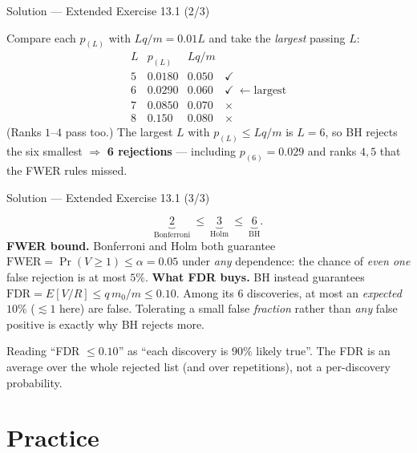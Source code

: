 \documentclass[aspectratio=169,11pt]{beamer}
\begin{document}
\begin{frame}{Solution --- Extended Exercise 13.1 (2/3)}
\begin{solutionbox}
  Compare each $p_{(L)}$ with $Lq/m=0.01L$ and take the \emph{largest} passing $L$:
  \[
    \begin{array}{c|c|c|c}
      L & p_{(L)} & Lq/m & \\ \hline
      5 & 0.0180 & 0.050 & \checkmark\\
      6 & 0.0290 & 0.060 & \checkmark\ \leftarrow \text{largest}\\
      7 & 0.0850 & 0.070 & \times\\
      8 & 0.150  & 0.080 & \times
    \end{array}
  \]
  (Ranks $1$--$4$ pass too.) The largest $L$ with $p_{(L)}\le Lq/m$ is $L=6$, so BH
  rejects the six smallest $\Rightarrow$ \textbf{6 rejections} --- including
  $p_{(6)}=0.029$ and ranks $4,5$ that the FWER rules missed.
\end{solutionbox}
\end{frame}

\begin{frame}{Solution --- Extended Exercise 13.1 (3/3)}
\begin{solutionbox}
  \[
    \underbrace{2}_{\text{Bonferroni}}\ \le\
    \underbrace{3}_{\text{Holm}}\ \le\
    \underbrace{6}_{\text{BH}} .
  \]
  \textbf{FWER bound.} Bonferroni and Holm both guarantee
  $\mathrm{FWER}=\Pr(V\ge1)\le\alpha=0.05$ under \emph{any} dependence: the chance of
  \emph{even one} false rejection is at most $5\%$.
  \medskip
  \textbf{What FDR buys.} BH instead guarantees
  $\mathrm{FDR}=E[V/R]\le q\,m_0/m\le 0.10$. Among its $6$ discoveries, at most an
  \emph{expected} $10\%$ ($\lesssim1$ here) are false. Tolerating a small false
  \emph{fraction} rather than \emph{any} false positive is exactly why BH rejects more.

\end{solutionbox}
\begin{mistake}
  Reading ``FDR $\le 0.10$'' as ``each discovery is $90\%$ likely true''. The FDR
  is an average over the whole rejected list (and over repetitions), not a
  per-discovery probability.
\end{mistake}
\end{frame}

\section{Practice}
\end{document}
